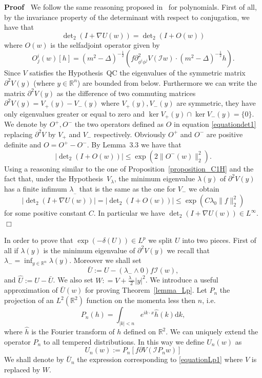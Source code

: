 \documentclass[a4paper,10pt]{article}
\newcommand{\assign}{:=}
\newcommand{\mathd}{\mathrm{d}}
\newenvironment{proof}{\noindent\textbf{Proof\ }}{\hspace*{\fill}$\Box$\medskip}
\begin{document}
\begin{proof}
  We follow the same reasoning proposed in~{\cite{Klein1984}} for polynomials.
  First of all, by the invariance property of the determinant with respect to
  conjugation, we have that
  \[ \det\nolimits_2 (I + \nabla U (w)) = \det\nolimits_2 (I + O (w)) \]
  where $O (w)$ is the selfadjoint operator given by
  \begin{equation}
    O^i_j (w) [h] = (m^2 - \Delta)^{- \frac{1}{2}} (f \partial_{\phi^i
    \phi^j}^2 V (\mathcal{I}w) \cdot (m^2 - \Delta)^{- \frac{1}{2}} h) .
    \label{equationdet1}
  \end{equation}
  Since $V$ satisfies the Hypothesis~QC the eigenvalues of the symmetric
  matrix $\partial^2 V (y)$ (where $y \in \mathbb{R}^n$) are bounded from
  below. Furthermore we can write the matrix $\partial^2 V (y)$ as the
  difference of two commuting matrices $\partial^2 V (y) = V_+ (y) - V_- (y)$
  where $V_+ (y), V_- (y)$ are symmetric, they have only eigenvalues greater
  or equal to zero and $\ker V_+ (y) \cap \ker V_- (y) = \{ 0 \}$. We denote
  by $O^+, O^-$ the two operators defined as $O$ in equation
  {\eqref{equationdet1}} replacing $\partial^2 V$ by $V_+$ and $V_-$
  respectively. Obviously $O^+$ and $O^-$ are positive definite and $O = O^+ -
  O^-$. By Lemma~3.3 {\cite{Klein1984}} we have that
  \[ | \det\nolimits_2 (I + O (w)) | \leqslant \exp (2 \| O^- (w) \|^2_2) . \]
  Using a reasoning similar to the one of Proposition~\ref{proposition_C1H}
  and the fact that, under the Hypothesis~$V_{\lambda}$, the minimum
  eigenvalue $\lambda (y)$ of $\partial^2 V (y)$ has a finite infimum
  $\lambda_{_-}$ that is the same as the one for $V_-$ we obtain
  \[ | \det\nolimits_2 (I + \nabla U (w)) | = | \det\nolimits_2 (I + O (w)) | \leqslant \exp (C
     \lambda_0 \| f \|_2^2) \]
  for some positive constant $C$. In particular we have $\det\nolimits_2 (I + \nabla U
  (w)) \in L^{\infty} .$
\end{proof}

In order to prove that $\exp (- \delta (U)) \in L^p$ we split $U$ into two
pieces. First of all if $\lambda (y)$ is the minimum eigenvalue of $\partial^2
V (y)$ we recall that $\lambda_- = \inf_{y \in \mathbb{R}^n} \lambda (y)$.
Moreover we shall set
\[ \bar{U} \assign U - (\lambda_- \wedge 0) f\mathcal{I} (w), \]
and $\hat{U} \assign U - \bar{U}$. We also set $W : = V + \frac{\lambda_-}{2}
| y |^2$. We introduce a useful approximation of $\bar{U} (w)$ for proving
Theorem~\ref{lemma_Lp}. Let $P_n$ the projection of an $L^2 (\mathbb{R}^2)$
function on the momenta less then $n$, i.e.
\[ P_n (h) = \int_{| k | < n} e^{i k \cdot x} \hat{h} (k) \mathd k, \]
where $\hat{h}$ is the Fourier transform of $h$ defined on $\mathbb{R}^2$. We
can uniquely extend the operator $P_n$ to all tempered distributions. In this
way we define $U_n (w)$ as
\begin{equation}
  U_n (w) \assign P_n [f \partial V (\mathcal{I}P_n w)]  \label{equationLp1}
\end{equation}
We shall denote by $\bar{U}_n$ the expression corresponding to
{\eqref{equationLp1}} where $V$ is replaced by $W$.
\end{document}
